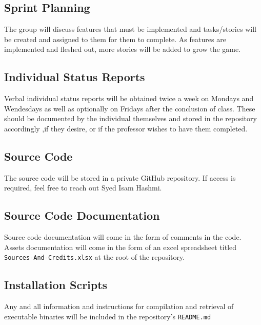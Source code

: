 \subsection{Sprint Planning}
The group will discuss features that must be implemented
and tasks/stories will be created and assigned to them
for them to complete. As features are implemented and
fleshed out, more stories will be added to grow the game.

\subsection{Individual Status Reports}
Verbal individual status reports will be obtained twice a week
on Mondays and Wendesdays as well as optionally on Fridays
after the conclusion of class.
These should be documented by the individual themselves and
stored in the repository accordingly ,if they desire, or if
the professor wishes to have them completed.

\subsection{Source Code}
The source code will be stored in a private GitHub repository.
If access is required, feel free to reach out Syed Isam Hashmi.

\subsection{Source Code Documentation}
Source code documentation will come in the form of comments in the code.
Assets documentation will come in the form of an excel spreadsheet
titled \texttt{Sources-And-Credits.xlsx} at the root of the repository.

\subsection{Installation Scripts}
Any and all information and
instructions for compilation and retrieval of executable
binaries will be included in the repository's \texttt{README.md}
